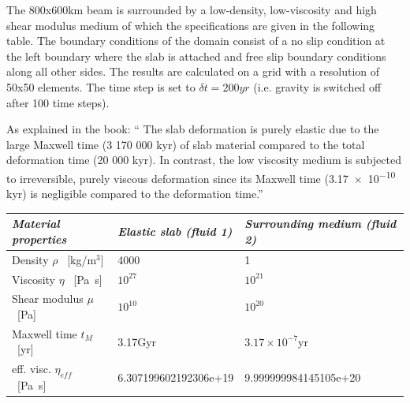 The 800x600km beam is surrounded by a low-density, low-viscosity and high shear modulus medium 
of which the specifications are given in  the following table.
The boundary conditions of the domain consist of a no slip condition at  
the left boundary where the slab is attached and free slip boundary conditions along all other sides. 
The results are calculated on a grid with a resolution of 50x50 elements.
The time step is set to $\delta t = 200yr$ (i.e. gravity is switched off after 100 time steps).

As explained in the book: ``
The slab deformation is purely elastic due to the large Maxwell time (3 170 000 kyr) of slab material
compared to the total deformation time (20 000 kyr). In contrast, the low viscosity medium
is subjected to irreversible, purely viscous deformation since its Maxwell time (\num{3.17e-10} kyr) 
is negligible compared to the deformation time.''

\begin{center}
\begin{tabular}{lll}
\hline 
\textit{Material properties}& \textit{Elastic slab (fluid 1)}  & \textit{Surrounding medium (fluid 2)} \\
\hline 
\hline
Density         $\rho$ \  [kg/m$^{3}$]            & 4000                    & 1     \\
Viscosity       $\eta$ \  [\si{\pascal\second}]    & $10^{27}$               &   $10^{21}$     \\
Shear modulus   $\mu $ \  [\si{\pascal}]           & $10^{10}$               & $10^{20}$       \\
Maxwell time $t_M$     \  [yr]                     & 3.17Gyr                 &  $3.17\times10^{-7}$yr       \\
eff. visc.      $\eta_{eff}$ \ [\si{\pascal\second}] & 6.307199602192306e+19   &  9.999999984145105e+20      \\
\hline
\end{tabular}
\end{center}


